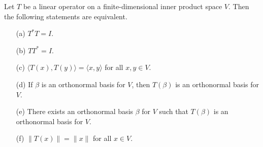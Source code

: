 \begin{theorem}
    Let \( T  \) be a linear operator on a finite-dimensional inner product space \( V  \). Then the following statements are equivalent.
    \begin{enumerate}
        \item[(a)] \( T^{*} T = I  \).
        \item[(b)] \( T T^{*} = I  \).
        \item[(c)] \( \langle T(x) , T(y) \rangle = \langle x , y \rangle  \) for all \( x , y \in V  \).
        \item[(d)] If \( \beta  \) is an orthonormal basis for \( V  \), then \( T(\beta) \) is an orthonormal basis for \( V  \).
        \item[(e)] There exists an orthonormal basis \( \beta  \) for \( V  \) such that \( T(\beta) \) is an orthonormal basis for \( V  \).
        \item[(f)] \( \|T(x)\| = \|x\|  \) for all \( x \in V  \).
    \end{enumerate}
\end{theorem} 

